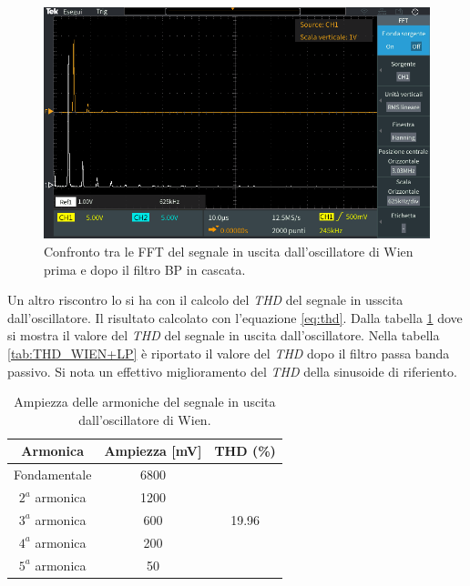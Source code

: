 \documentclass[titlepage]{report}
\begin{document}
	\begin{figure}[H]
		\centering
		\includegraphics[scale=0.5]{Immagini/fft_osc+bp210k.PNG}
		\caption{Confronto tra le FFT del segnale in uscita dall'oscillatore di Wien prima e dopo il filtro BP in cascata.}
		\label{fig:FFTwien+BP}
	\end{figure}

	Un altro riscontro lo si ha con il calcolo del \textit{THD} del segnale in usscita dall'oscillatore. Il risultato calcolato con l'equazione \ref{eq:thd}. Dalla tabella \ref{tab:THD_WIEN} dove si mostra il valore del \textit{THD} del segnale in uscita dall'oscillatore. Nella tabella \ref{tab:THD_WIEN+LP} è riportato il valore del \textit{THD} dopo il filtro passa banda passivo. Si nota un effettivo miglioramento del \textit{THD} della sinusoide di riferiento.

	\begin{table}[h!]
		\centering
		\begin{tabular}{||c|c|c||}
			\hline
			\cellcolor{gray!10}Armonica & \cellcolor{gray!10}Ampiezza [mV] & \cellcolor{gray!10}THD (\%) \\
			\hline
			Fondamentale & 6800 &\\
			\cline{1-2}
			$2^a$ armonica & 1200 & \\
			\cline{1-2} 
			$3^a$ armonica & 600 & 19.96 \\
			\cline{1-2} 
			$4^a$ armonica & 200 & \\
			\cline{1-2} 
			$5^a$ armonica & 50 & \\
			\hline	
		\end{tabular}
		\caption{Ampiezza delle armoniche del segnale in uscita dall'oscillatore di Wien.}
		\label{tab:THD_WIEN}
	\end{table}
\end{document}
